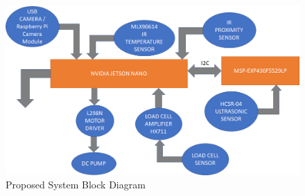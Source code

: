 \begin{figure}[H]
	\centering
	\includegraphics[width=0.7\linewidth]{images/updated bd}
	\caption{Proposed System Block Diagram}
	\label{fig:updated bd}
\end{figure}


		
